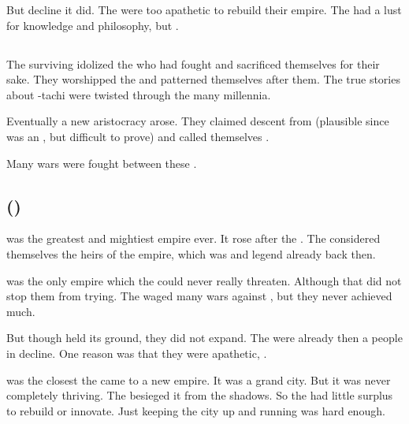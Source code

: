 But decline it did.
The \quiljaaran were too apathetic to rebuild their empire. 
The \quiljaaran had a lust for knowledge and philosophy, but . 









\subsection{\Dragonkings}
The surviving \ophidians idolized the \dragons who had fought and sacrificed themselves for their sake. 
They worshipped the \dragons and patterned themselves after them. 
The true stories about \Sethicus-tachi were twisted through the many millennia. 

Eventually a new aristocracy arose. 
They claimed descent from \Sethicus (plausible since \Sethicus was an \ophidian, but difficult to prove) and called themselves \quo{\dragonkings}. 

Many wars were fought between these \dragonkings. 









\subsection{\Saphyrae ()}
\index{\Saphyrae}
\Saphyrae{} was the greatest and mightiest \quiljaaran{} empire ever. 
It rose after the \firstbanewar. 
The \Saphyraeans{} considered themselves the heirs of the \ophidian{} empire, which was  and legend already back then. 

\Saphyrae{} was the only \quiljaaran{} empire which the \aryothim{} could never really threaten. 
Although that did not stop them from trying. 
The \aryothim{} waged many wars against \Saphyrae, but they never achieved much. 

But though \Saphyrae{} held its ground, they did not expand. 
The \quiljaaran{} were already then a people in decline. 
One reason was that they were apathetic, . 

\Saphyrae was the closest the \ophidians came to a new empire. 
It was a grand city.
But it was never completely thriving. 
The \noggyaleth besieged it from the shadows. 
So the \ophidians had little surplus to rebuild or innovate. 
Just keeping the city up and running was hard enough. 

